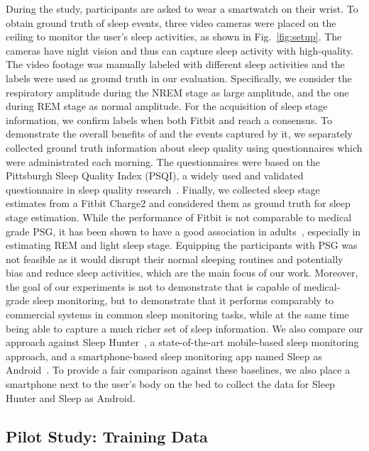 During the study, participants are asked to wear a smartwatch on their wrist. To obtain ground truth of sleep events, three video cameras were placed on the ceiling to monitor the user's sleep activities, as shown in Fig.~\ref{fig:setup}. The cameras have night vision and thus can capture sleep activity with high-quality. The video footage was manually labeled with different sleep activities and the labels were used as ground truth in our evaluation. Specifically, we consider the respiratory amplitude during the NREM stage as large amplitude, and the one during REM stage as normal amplitude. For the acquisition of sleep stage information, we confirm labels when both Fitbit and {\systemname} reach a consensus. To demonstrate the overall benefits of {\systemname} and the events captured by it, we separately collected ground truth information about sleep quality using questionnaires which were administrated each morning. The questionnaires were based on the Pittsburgh Sleep Quality Index (PSQI), a widely used and validated questionnaire in sleep quality research~\cite{buysse1989pittsburgh}. Finally, we collected sleep stage estimates from a Fitbit Charge2 and considered them as ground truth for sleep stage estimation. While the performance of Fitbit is not comparable to medical grade PSG, it has been shown to have a good association in adults~\cite{evenson2015systematic,fitbit01,fitbit02,fitbit03}, especially in estimating REM and light sleep stage. Equipping the participants with PSG was not feasible as it would disrupt their normal sleeping routines and potentially bias and reduce sleep activities, which are the main focus of our work. Moreover, the goal of our experiments is not to demonstrate that {\systemname} is capable of medical-grade sleep monitoring, but to demonstrate that it performs comparably to commercial systems in common sleep monitoring tasks, while at the same time being able to capture a much richer set of sleep information. We also compare our approach against Sleep Hunter~\cite{gu2016sleep}, a state-of-the-art mobile-based sleep monitoring approach, and a smartphone-based sleep monitoring app named Sleep as Android~\cite{SleepAndroid}. To provide a fair comparison against these baselines, we also place a smartphone next to the user's body on the bed to collect the data for Sleep Hunter and Sleep as Android.
	

\subsection{{Pilot Study: Training Data}}\label{sec:trainingdata}

